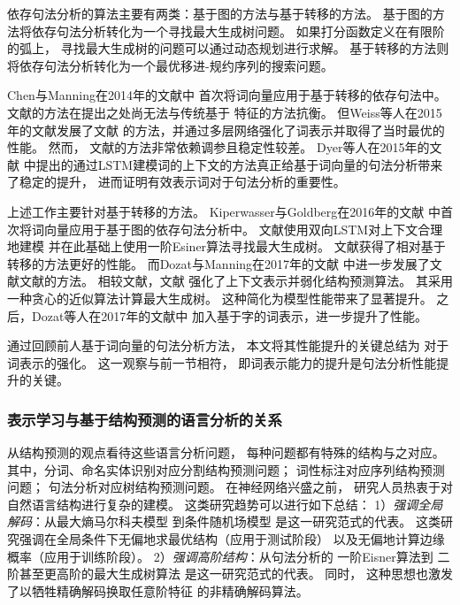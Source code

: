 依存句法分析的算法主要有两类：基于图的方法与基于转移的方法。
基于图的方法将依存句法分析转化为一个寻找最大生成树问题。
如果打分函数定义在有限阶的弧上，
寻找最大生成树的问题可以通过动态规划进行求解\cite{mcdonald2006online}。
基于转移的方法则将依存句法分析转化为一个最优移进-规约序列的搜索问题\cite{nivre2008algorithms}。

Chen与Manning在2014年的文献中
首次将词向量应用于基于转移的依存句法中。
文献的方法在提出之处尚无法与传统基于
特征的方法抗衡。
但Weiss等人在2015年的文献发展了文献
的方法，并通过多层网络强化了词表示并取得了当时最优的性能。
然而，
文献的方法非常依赖调参且稳定性较差。
Dyer等人在2015年的文献
中提出的通过LSTM建模词的上下文的方法真正给基于词向量的句法分析带来了稳定的提升，
进而证明有效表示词对于句法分析的重要性。

上述工作主要针对基于转移的方法。
Kiperwasser与Goldberg在2016年的文献
中首次将词向量应用于基于图的依存句法分析中。
文献使用双向LSTM对上下文合理地建模
并在此基础上使用一阶Esiner算法寻找最大生成树。
文献获得了相对基于转移的方法更好的性能。
而Dozat与Manning在2017年的文献
中进一步发展了文献文献的方法。
相较文献，文献
强化了上下文表示并弱化结构预测算法。
其采用一种贪心的近似算法计算最大生成树。
这种简化为模型性能带来了显著提升。
之后，Dozat等人在2017年的文献中
加入基于字的词表示，进一步提升了性能。

通过回顾前人基于词向量的句法分析方法，
本文将其性能提升的关键总结为
对于词表示的强化。
这一观察与前一节相符，
即词表示能力的提升是句法分析性能提升的关键。

\subsubsection{表示学习与基于结构预测的语言分析的关系}\label{sec:intro:review:lang-anal:relation}
从结构预测的观点看待这些语言分析问题，
每种问题都有特殊的结构与之对应。
其中，分词、命名实体识别对应分割结构预测问题；
词性标注对应序列结构预测问题；
句法分析对应树结构预测问题。
在神经网络兴盛之前，
研究人员热衷于对自然语言结构进行复杂的建模。
这类研究趋势可以进行如下总结：
1）\textit{强调全局解码}：从最大熵马尔科夫模型\cite{McCallum:2000:MEM:645529.658277}
到条件随机场模型\cite{Lafferty:2001:CRF:645530.655813}
是这一研究范式的代表。
这类研究强调在全局条件下无偏地求最优结构（应用于测试阶段）
以及无偏地计算边缘概率（应用于训练阶段）。
2）\textit{强调高阶结构}：从句法分析的
一阶Eisner算法\cite{eisner-1996-coling}到
二阶甚至更高阶的最大生成树算法\cite{mcdonald2006online}
是这一研究范式的代表。
同时，
这种思想也激发了以牺牲精确解码换取任意阶特征
的非精确解码算法\cite{zhang-clark:cl:2011}。

